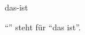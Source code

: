 \documentclass{stex}
\begin{document}
\begin{smodule}{das-ist}
\begin{sparagraph}[style=symdoc]
``'' steht für ``das ist''.
\end{sparagraph}
\end{smodule}
\end{document}
